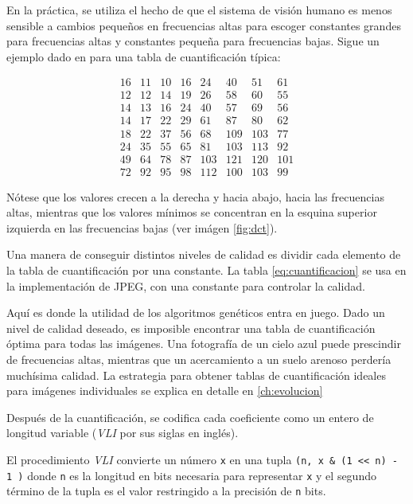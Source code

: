 En la práctica, se utiliza el hecho de que el sistema de visión humano es menos
sensible a cambios pequeños en frecuencias altas para escoger constantes
grandes para frecuencias altas y constantes pequeña para frecuencias bajas.
Sigue un ejemplo dado en \cite{JPEG_paper} para una tabla de cuantificación
típica:

\begin{equation}
    \begin{matrix}
        16 & 11 & 10 & 16 & 24  & 40  & 51  & 61 \\
        12 & 12 & 14 & 19 & 26  & 58  & 60  & 55 \\
        14 & 13 & 16 & 24 & 40  & 57  & 69  & 56 \\
        14 & 17 & 22 & 29 & 61  & 87  & 80  & 62 \\
        18 & 22 & 37 & 56 & 68  & 109 & 103 & 77 \\
        24 & 35 & 55 & 65 & 81  & 103 & 113 & 92 \\
        49 & 64 & 78 & 87 & 103 & 121 & 120 & 101 \\
        72 & 92 & 95 & 98 & 112 & 100 & 103 & 99
    \end{matrix}
\end{equation}
\label{eq:cuantificacion}

Nótese que los valores crecen a la derecha y hacia abajo, hacia las frecuencias
altas, mientras que los valores mínimos se concentran en la esquina superior
izquierda en las frecuencias bajas (ver imágen \ref{fig:dct}).

Una manera de conseguir distintos niveles de calidad es dividir cada elemento
de la tabla de cuantificación por una constante. La tabla
\ref{eq:cuantificacion} se usa en la implementación de JPEG, con una constante
para controlar la calidad.

Aquí es donde la utilidad de los algoritmos genéticos entra en juego. Dado un
nivel de calidad deseado, es imposible encontrar una tabla de cuantificación
óptima para todas las imágenes. Una fotografía de un cielo azul puede
prescindir de frecuencias altas, mientras que un acercamiento a un suelo
arenoso perdería muchísima calidad. La estrategia para obtener tablas de
cuantificación ideales para imágenes individuales se explica en detalle en
\ref{ch:evolucion}


Después de la cuantificación, se codifica cada coeficiente como un entero de
longitud variable (\emph{VLI} por sus siglas en inglés).

El procedimiento \emph{VLI} convierte un número \verb+x+ en una tupla \verb+(n, x & (1 << n) - 1 )+
donde \verb+n+ es la longitud en bits necesaria para
representar \verb+x+ y el segundo término de la tupla es el valor restringido a
la precisión de \verb+n+ bits.

